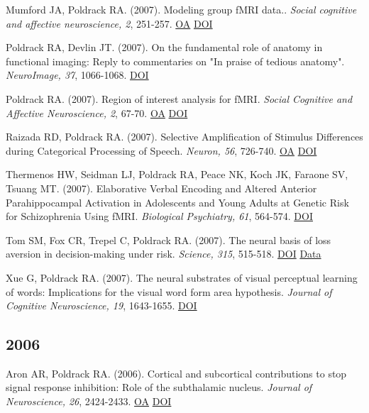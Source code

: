 \documentclass[10pt, letterpaper]{article}
\begin{document}
Mumford JA, Poldrack RA.  (2007). Modeling group fMRI data.. \textit{Social cognitive and affective neuroscience, 2}, 251-257. \href{https://www.ncbi.nlm.nih.gov/pmc/articles/PMC2569805}{OA} \href{https://doi.org/10.1093/scan/nsm019}{DOI} \vspace{2mm}

Poldrack RA, Devlin JT.  (2007). On the fundamental role of anatomy in functional imaging: Reply to commentaries on "In praise of tedious anatomy". \textit{NeuroImage, 37}, 1066-1068. \href{https://doi.org/10.1016/j.neuroimage.2007.06.019}{DOI} \vspace{2mm}

Poldrack RA.  (2007). Region of interest analysis for fMRI. \textit{Social Cognitive and Affective Neuroscience, 2}, 67-70. \href{https://www.ncbi.nlm.nih.gov/pmc/articles/PMC2555436}{OA} \href{https://doi.org/10.1093/scan/nsm006}{DOI} \vspace{2mm}

Raizada RD, Poldrack RA.  (2007). Selective Amplification of Stimulus Differences during Categorical Processing of Speech. \textit{Neuron, 56}, 726-740. \href{https://doi.org/10.1016/j.neuron.2007.11.001}{OA} \href{https://doi.org/10.1016/j.neuron.2007.11.001}{DOI} \vspace{2mm}

Thermenos HW, Seidman LJ, Poldrack RA, Peace NK, Koch JK, Faraone SV, Tsuang MT.  (2007). Elaborative Verbal Encoding and Altered Anterior Parahippocampal Activation in Adolescents and Young Adults at Genetic Risk for Schizophrenia Using fMRI. \textit{Biological Psychiatry, 61}, 564-574. \href{https://doi.org/10.1016/j.biopsych.2006.04.044}{DOI} \vspace{2mm}

Tom SM, Fox CR, Trepel C, Poldrack RA.  (2007). The neural basis of loss aversion in decision-making under risk. \textit{Science, 315}, 515-518. \href{https://doi.org/10.1126/science.1134239}{DOI} \href{https://openneuro.org/datasets/ds000008/versions/00001}{Data} \vspace{2mm}

Xue G, Poldrack RA.  (2007). The neural substrates of visual perceptual learning of words: Implications for the visual word form area hypothesis. \textit{Journal of Cognitive Neuroscience, 19}, 1643-1655. \href{https://doi.org/10.1162/jocn.2007.19.10.1643}{DOI} \vspace{2mm}

\subsection*{2006}Aron AR, Poldrack RA.  (2006). Cortical and subcortical contributions to stop signal response inhibition: Role of the subthalamic nucleus. \textit{Journal of Neuroscience, 26}, 2424-2433. \href{https://www.ncbi.nlm.nih.gov/pmc/articles/PMC6793670}{OA} \href{https://doi.org/10.1523/jneurosci.4682-05.2006}{DOI} \vspace{2mm}
\end{document}

